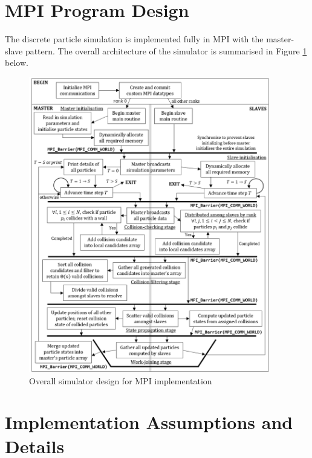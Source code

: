 \documentclass[12pt]{article}
\begin{document}
\maketitle
\setcounter{tocdepth}{1}
\tableofcontents

\pagebreak
\large{}
\section{MPI Program Design}

The discrete particle simulation is implemented fully in MPI with the master-slave pattern. The overall architecture of the simulator is summarised in Figure \ref{fig:simulator-design} below.

\begin{figure}[H]
    \includegraphics[width=0.94\textwidth]{chap1Flowchart-MPI}
    \centering
    \caption{Overall simulator design for MPI implementation}
    \label{fig:simulator-design}
\end{figure}

\pagebreak

\section{Implementation Assumptions and Details}
\end{document}
